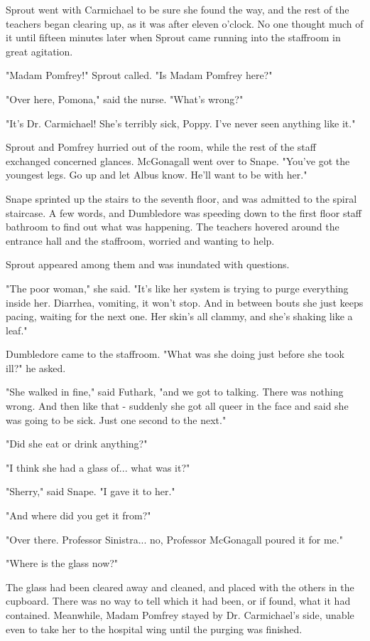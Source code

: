 \documentclass[a4paper,11pt]{article}
\begin{document}
Sprout went with Carmichael to be sure she found the way, and the rest of the teachers began clearing up, as it was after eleven o'clock. No one thought much of it until fifteen minutes later when Sprout came running into the staffroom in great agitation.

"Madam Pomfrey!" Sprout called. "Is Madam Pomfrey here?"

"Over here, Pomona," said the nurse. "What's wrong?"

"It's Dr. Carmichael! She's terribly sick, Poppy. I've never seen anything like it."

Sprout and Pomfrey hurried out of the room, while the rest of the staff exchanged concerned glances. McGonagall went over to Snape. "You've got the youngest legs. Go up and let Albus know. He'll want to be with her."

Snape sprinted up the stairs to the seventh floor, and was admitted to the spiral staircase. A few words, and Dumbledore was speeding down to the first floor staff bathroom to find out what was happening. The teachers hovered around the entrance hall and the staffroom, worried and wanting to help.

Sprout appeared among them and was inundated with questions.

"The poor woman," she said. "It's like her system is trying to purge everything inside her. Diarrhea, vomiting, it won't stop. And in between bouts she just keeps pacing, waiting for the next one. Her skin's all clammy, and she's shaking like a leaf."

Dumbledore came to the staffroom. "What was she doing just before she took ill?" he asked.

"She walked in fine," said Futhark, "and we got to talking. There was nothing wrong. And then like that - suddenly she got all queer in the face and said she was going to be sick. Just one second to the next."

"Did she eat or drink anything?"

"I think she had a glass of... what was it?"

"Sherry," said Snape. "I gave it to her."

"And where did you get it from?"

"Over there. Professor Sinistra... no, Professor McGonagall poured it for me."

"Where is the glass now?"

The glass had been cleared away and cleaned, and placed with the others in the cupboard. There was no way to tell which it had been, or if found, what it had contained. Meanwhile, Madam Pomfrey stayed by Dr. Carmichael's side, unable even to take her to the hospital wing until the purging was finished.
\end{document}

